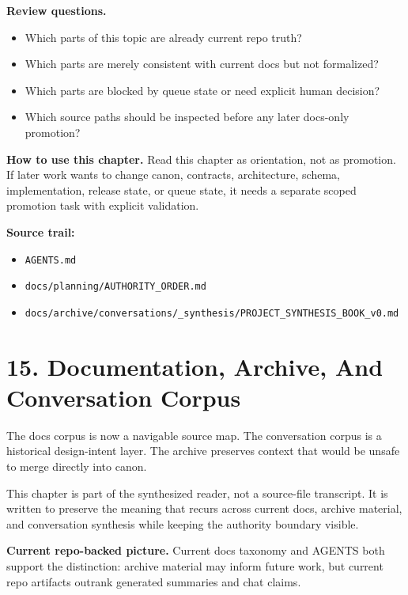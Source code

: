 \documentclass[10.5pt,a4paper,openany]{book}
\begin{document}
\textbf{Review questions.}


\begin{itemize}
\item Which parts of this topic are already current repo truth?
\item Which parts are merely consistent with current docs but not formalized?
\item Which parts are blocked by queue state or need explicit human decision?
\item Which source paths should be inspected before any later docs-\allowbreak{}only promotion?
\end{itemize}

\textbf{How to use this chapter.} Read this chapter as orientation, not as promotion.\allowbreak{} If later work wants to change canon, contracts, architecture, schema, implementation, release state, or queue state, it needs a separate scoped promotion task with explicit validation.\allowbreak{}


\textbf{Source trail:}


\begin{itemize}
\item \texttt{AGENTS.\allowbreak{}md}
\item \texttt{docs/\allowbreak{}planning/\allowbreak{}AUTHORITY\_\allowbreak{}ORDER.\allowbreak{}md}
\item \texttt{docs/\allowbreak{}archive/\allowbreak{}conversations/\allowbreak{}\_\allowbreak{}synthesis/\allowbreak{}PROJECT\_\allowbreak{}SYNTHESIS\_\allowbreak{}BOOK\_\allowbreak{}v0.\allowbreak{}md}
\end{itemize}


\section{15. Documentation, Archive, And Conversation Corpus}

The docs corpus is now a navigable source map.\allowbreak{} The conversation corpus is a historical design-\allowbreak{}intent layer.\allowbreak{} The archive preserves context that would be unsafe to merge directly into canon.\allowbreak{}


This chapter is part of the synthesized reader, not a source-\allowbreak{}file transcript.\allowbreak{} It is written to preserve the meaning that recurs across current docs, archive material, and conversation synthesis while keeping the authority boundary visible.\allowbreak{}


\textbf{Current repo-backed picture.} Current docs taxonomy and AGENTS both support the distinction: archive material may inform future work, but current repo artifacts outrank generated summaries and chat claims.\allowbreak{}
\end{document}
